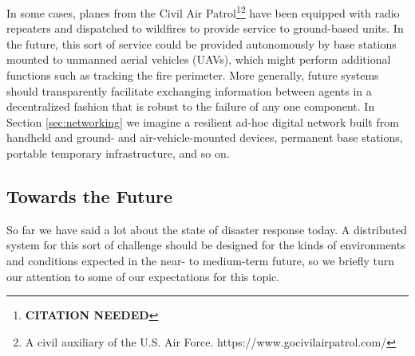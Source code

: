 \documentclass[]             %
{NASA}                       %
\theoremstyle{definition}
\newcommand{\citationneeded}{\footnote{\textbf{CITATION NEEDED}}}
\begin{document}
In some cases, planes from the Civil Air
Patrol\citationneeded\footnote{A civil auxiliary of the U.S. Air
Force. https://www.gocivilairpatrol.com/} have been equipped with
radio repeaters and dispatched to wildfires to provide service to
ground-based units. In the future, this sort of service could be
provided autonomously by base stations mounted to unmanned aerial
vehicles (UAVs), which might perform additional functions such as
tracking the fire perimeter. More generally, future systems should
transparently facilitate exchanging information between agents in a
decentralized fashion that is robust to the failure of any one
component. In Section \ref{sec:networking} we imagine a resilient
ad-hoc digital network built from handheld and ground- and
air-vehicle-mounted devices, permanent base stations, portable
temporary infrastructure, and so on.

\subsection{Towards the Future}\label{towards-the-future}

So far we have said a lot about the state of disaster response
today. A distributed system for this sort of challenge should be
designed for the kinds of environments and conditions expected in the
near- to medium-term future, so we briefly turn our attention to some
of our expectations for this topic.
\end{document}
